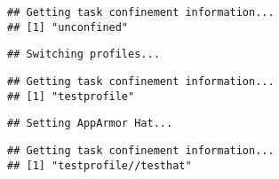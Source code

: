 


\begin{knitrout}\mycodesize
{}\color{fgcolor}\begin{kframe}
\begin{alltt}
\hlstd{()}\hlopt{$}
\end{alltt}
\begin{verbatim}
## Getting task confinement information...
## [1] "unconfined"
\end{verbatim}
\begin{alltt}
 \hlkwb{<-} \hlstd{(}\hlstd{)}

\hlstd{(}\hlstd{)}
\end{alltt}
\begin{verbatim}
## Switching profiles...
\end{verbatim}
\begin{alltt}
\hlstd{()}\hlopt{$}
\end{alltt}
\begin{verbatim}
## Getting task confinement information...
## [1] "testprofile"
\end{verbatim}
\begin{alltt}
 \hlkwb{<-} \hlstd{(}\hlstd{)}
\end{alltt}

{\ttfamily\noindent\bfseries\color{errorcolor}{\#\# Error: cannot open the connection}}\begin{alltt}
 \hlkwb{<-} \hlstd{(}\hlstd{)}

 \hlkwb{<-} 
\hlstd{(}
\end{alltt}
\begin{verbatim}
## Setting AppArmor Hat...
\end{verbatim}
\begin{alltt}
\hlstd{()}\hlopt{$}
\end{alltt}
\begin{verbatim}
## Getting task confinement information...
## [1] "testprofile//testhat"
\end{verbatim}
\begin{alltt}
 \hlkwb{<-} \hlstd{(}\hlstd{)}
\end{alltt}



\end{kframe}
\end{knitrout}
